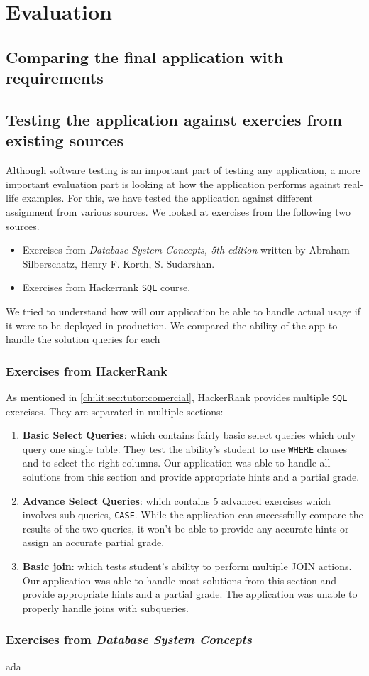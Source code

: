 \chapter{Evaluation}

\section{Comparing the final application with requirements}

\section{Testing the application against exercies from existing sources}
Although software testing is an important part of testing any application, a more important evaluation part is looking at how the application performs against real-life examples. For this, we have tested the application against different assignment from various sources. We looked at exercises from the following two sources.

\begin{itemize}
    \item Exercises from \textit{Database System Concepts, 5th edition} written by Abraham Silberschatz, Henry F. Korth, S. Sudarshan.
    \item Exercises from Hackerrank \texttt{SQL} course.
\end{itemize}

We tried to understand how will our application be able to handle actual usage if it were to be deployed in production. We compared the ability of the app to handle the solution queries for each

\subsection{Exercises from HackerRank}

As mentioned in \ref{ch:lit:sec:tutor:comercial}, HackerRank provides multiple \texttt{SQL} exercises. They are separated in multiple sections:

\begin{enumerate}
    \item \textbf{Basic Select Queries}: which contains fairly basic select queries which only query one single table. They test the ability's student to use \texttt{WHERE} clauses and to select the right columns. Our application was able to handle all solutions from this section and provide appropriate hints and a partial grade.
    \item \textbf{Advance Select Queries}: which contains 5 advanced exercises which involves sub-queries, \texttt{CASE}. While the application can successfully compare the results of the two queries, it won't be able to provide any accurate hints or assign an accurate partial grade.
    \item \textbf{Basic join}: which tests student's ability to perform multiple JOIN actions. Our application was able to handle most solutions from this section and provide appropriate hints and a partial grade. The application was unable to properly handle joins with subqueries.
\end{enumerate}

\subsection{Exercises from \textit{Database System Concepts}}
ada

